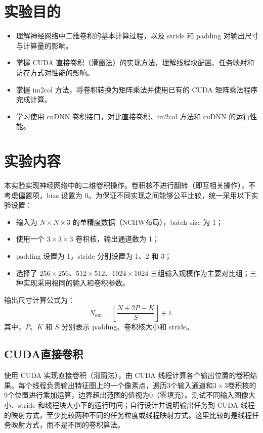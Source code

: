 \documentclass{SYSUReport}
\date{2026年6月15日}
\begin{document}
\cover
\thispagestyle{empty}
\clearpage

\section{实验目的}
\begin{itemize}
    \item 理解神经网络中二维卷积的基本计算过程，以及 stride 和 padding 对输出尺寸与计算量的影响。
    \item 掌握 CUDA 直接卷积（滑窗法）的实现方法，理解线程块配置、任务映射和访存方式对性能的影响。
    \item 掌握 im2col 方法，将卷积转换为矩阵乘法并使用已有的 CUDA 矩阵乘法程序完成计算。
    \item 学习使用 cuDNN 卷积接口，对比直接卷积、im2col 方法和 cuDNN 的运行性能。
\end{itemize}

\section{实验内容}
本实验实现神经网络中的二维卷积操作。卷积核不进行翻转（即互相关操作），不考虑偏置项，bias 设置为 0。为保证不同实现之间能够公平比较，统一采用以下实验设置：
\begin{itemize}
    \item 输入为 $N\times N\times3$ 的单精度数据（NCHW布局），batch size 为 1；
    \item 使用一个 $3\times3\times3$ 卷积核，输出通道数为 1；
    \item padding 设置为 1，stride 分别设置为 1、2 和 3；
    \item 选择了 $256\times256$、$512\times512$、$1024\times1024$ 三组输入规模作为主要对比组；三种实现采用相同的输入和卷积参数。
\end{itemize}
输出尺寸计算公式为：
\begin{equation*}
N_{\mathrm{out}}
=
\left\lfloor
\frac{N+2P-K}{S}
\right\rfloor
+1.
\end{equation*}
其中，$P$、$K$ 和 $S$ 分别表示 padding、卷积核大小和 stride。

\subsection{CUDA直接卷积}
使用 CUDA 实现直接卷积（滑窗法），由 CUDA 线程计算各个输出位置的卷积结果。每个线程负责输出特征图上的一个像素点，遍历3个输入通道和$3\times3$卷积核的9个位置进行乘加运算，边界超出范围的值视为0（零填充）。测试不同输入图像大小、stride 和线程块大小下的运行时间；自行设计并说明输出任务到 CUDA 线程的映射方式，至少比较两种不同的任务粒度或线程映射方式。这里比较的是线程任务映射方式，而不是不同的卷积算法。
\end{document}
